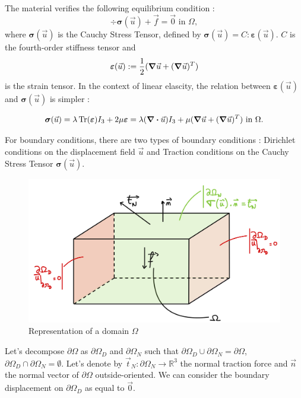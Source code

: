 \documentclass[a4paper,12pt,twoside]{report}
\newcommand{\mtr}{\mathbb{R}}
\begin{document}
The material verifies the following equilibrium condition : 
\begin{equation}
\label{eq:equilibrium}
    \div \boldsymbol{\sigma} (\vec u) + \vec f = \vec 0 \text{ in } \Omega,
\end{equation}
where $\boldsymbol{\sigma} (\vec u)$ is the Cauchy Stress Tensor, defined by $\boldsymbol{\sigma} (\vec u) = C : \boldsymbol{\varepsilon} (\vec u)$. $C$ is the fourth-order stiffness tensor and $$\boldsymbol{\varepsilon} (\vec u) := \frac{1}{2}(\grad \vec u + (\grad \vec u)^T)$$ is the strain tensor. In the context of linear elascity, the relation between $\boldsymbol{\varepsilon} (\vec u)$ and $\boldsymbol{\sigma} (\vec u)$ is simpler : 

\begin{equation}
\label{eq:hooklaw}
    \boldsymbol{\sigma} (\vec u) = \lambda \Tr(\boldsymbol{\varepsilon}) I_3 + 2\mu \boldsymbol \varepsilon = \lambda (\div \vec u) I_3 + \mu (\grad \vec u + (\grad \vec u)^T) \text{ in } \Omega.
\end{equation}

For boundary conditions, there are two types of boundary conditions : Dirichlet conditions on the displacement field $\vec u$ and Traction conditions on the Cauchy Stress Tensor $\boldsymbol \sigma (\vec u)$. 


\begin{figure}[!h]
	\centering
	\includegraphics[width=0.61\linewidth]{omega_domain}
	\caption{Representation of a domain $\Omega$}
	\label{fig:omegadomain}
\end{figure}

Let's decompose $\partial \Omega$ as $\partial \Omega_D$ and $\partial \Omega_N$ such that $\partial \Omega_D \cup \partial \Omega_N = \partial \Omega$, $\partial \Omega_D \cap \partial \Omega_N = \emptyset$. Let's denote by $\vec t_N : \partial \Omega_N \rightarrow \mtr^3$ the normal traction force and $\vec n$ the normal vector of $\partial \Omega$ outside-oriented. We can consider the boundary displacement on $\partial \Omega_D$ as equal to $\vec 0$. 
\end{document}

